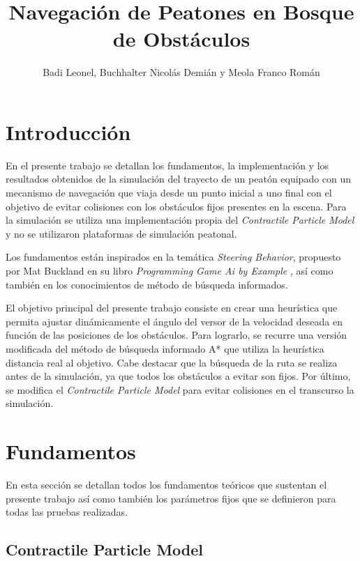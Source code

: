 \documentclass[a4paper,10pt]{article}
\title{Navegación de Peatones en Bosque de Obstáculos}
\author{Badi Leonel, Buchhalter Nicolás Demián y Meola Franco Román}
\begin{document}
\maketitle

\pagebreak

\tableofcontents

\newpage

\section{Introducción}

En el presente trabajo se detallan los fundamentos, la implementación y los resultados obtenidos de la simulación del trayecto de un peatón equipado con un mecanismo de navegación que viaja desde un punto inicial a uno final con el objetivo de  evitar colisiones con los obstáculos fijos presentes en la escena. Para la simulación se utiliza una implementación propia del \textit{Contractile Particle Model} y no se utilizaron plataformas de simulación peatonal.

Los fundamentos están inspirados en la temática \textit{Steering Behavior}, propuesto por Mat Buckland en su libro \textit{Programming Game Ai by Example} \cite{ai}, así como también en los conocimientos de método de búsqueda informados.

El objetivo principal del presente trabajo consiste en crear una heurística que permita ajustar dinámicamente el ángulo del versor de la velocidad deseada en función de las posiciones de los obstáculos. Para lograrlo, se recurre una versión modificada del método de búsqueda informado A* que utiliza la heurística distancia real al objetivo. Cabe destacar que la búsqueda de la ruta se realiza antes de la simulación, ya que todos los obstáculos a evitar son fijos. Por último, se modifica el \textit{Contractile Particle Model} para evitar colisiones en el transcurso la simulación.

\section{Fundamentos}

En esta sección se detallan todos los fundamentos teóricos que sustentan el presente trabajo así como también los parámetros fijos que se definieron para todas las pruebas realizadas.

\subsection{Contractile Particle Model}
\end{document}
